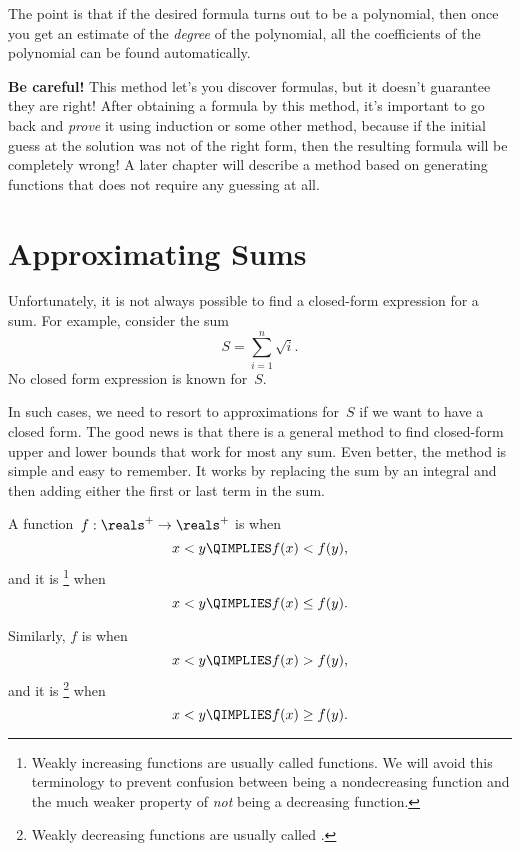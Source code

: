 The point is that if the desired formula turns out to be a polynomial,
then once you get an estimate of the \emph{degree} of the polynomial,
all the coefficients of the polynomial can be found automatically.

\textbf{Be careful!}  This method let's you discover formulas, but it
doesn't guarantee they are right!  After obtaining a formula by this
method, it's important to go back and \emph{prove} it using induction
or some other method, because if the initial guess at the solution was
not of the right form, then the resulting formula will be completely
wrong!  A later chapter will describe
a method based on generating functions that does not require any
guessing at all.


\section{Approximating Sums}

Unfortunately, it is not always possible to find a closed-form
expression for a sum.  For example, consider the sum
\[
    S = \sum_{i = 1}^n \sqrt{i}.
\]
No closed form expression is known for~$S$.

In such cases, we need to resort to approximations for~$S$ if we want
to have a closed form.  The good news is that there is a general
method to find closed-form upper and lower bounds that work for most
any sum.  Even better, the method is simple and easy to remember.  It
works by replacing the sum by an integral and then adding either the
first or last term in the sum.

\begin{definition}\label{weakly_increasing_function_def}
A function~$f: \reals^+ \to \reals^+$
is  when
\[
x < y \QIMPLIES f(x) < f(y),
\]
and it is \footnote{Weakly increasing
  functions are usually called  functions.  We
  will avoid this terminology to prevent confusion between being a
  nondecreasing function and the much weaker property
  of \emph{not} being a decreasing function.} when
\[
x < y \QIMPLIES f(x) \le f(y).
\]

Similarly, $f$ is  when
\[
x < y \QIMPLIES f(x) > f(y),
\]
and it is \footnote{Weakly decreasing
  functions are usually called .}  when
\[
x < y \QIMPLIES f(x) \ge f(y).
\]
\end{definition}

